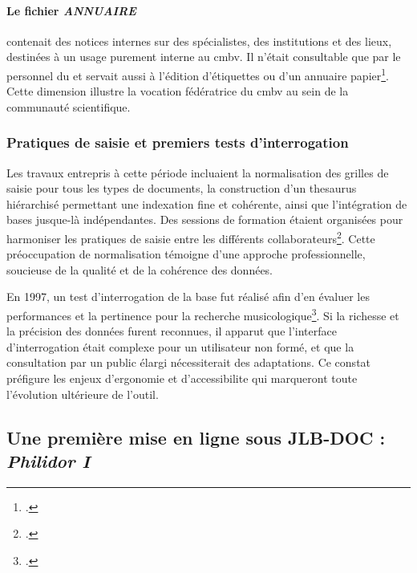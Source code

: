 \paragraph{Le fichier \textit{ANNUAIRE}} contenait des notices internes sur des spécialistes, des institutions et des lieux, destinées à un usage purement interne au \gls{cmbv}. Il n'était consultable que par le personnel du  et servait aussi à l'édition d'étiquettes ou d'un annuaire papier\footcite[Conseil scientifique d'octobre 1997]{michelbenoitDocumentationTechniqueBibliographique1997}. Cette dimension  illustre la vocation fédératrice du \gls{cmbv} au sein de la communauté scientifique.

\subsubsection{Pratiques de saisie et premiers tests d'interrogation}

Les travaux entrepris à cette période incluaient la normalisation des grilles de saisie pour tous les types de documents, la construction d'un \gls{thesaurus} hiérarchisé permettant une indexation fine et cohérente, ainsi que l'intégration de bases jusque-là indépendantes. Des sessions de formation étaient organisées pour harmoniser les pratiques de saisie entre les différents collaborateurs\footcite[Conseil scientifique d'octobre 1997]{michelbenoitDocumentationTechniqueBibliographique1997}. Cette préoccupation de normalisation témoigne d'une approche professionnelle, soucieuse de la qualité et de la cohérence des données.

En 1997, un test d'interrogation de la base fut réalisé afin d'en évaluer les performances et la pertinence pour la recherche musicologique\footcite[Conseil scientifique d'octobre 1997]{michelbenoitDocumentationTechniqueBibliographique1997}. Si la richesse et la précision des données furent reconnues, il apparut que l'interface d'interrogation était complexe pour un utilisateur non formé, et que la consultation par un public élargi nécessiterait des adaptations. Ce constat préfigure les enjeux d'ergonomie et d'\gls{accessibilite} qui marqueront toute l'évolution ultérieure de l'outil.

\subsection{Une première mise en ligne sous JLB-DOC : \textit{Philidor I}}

